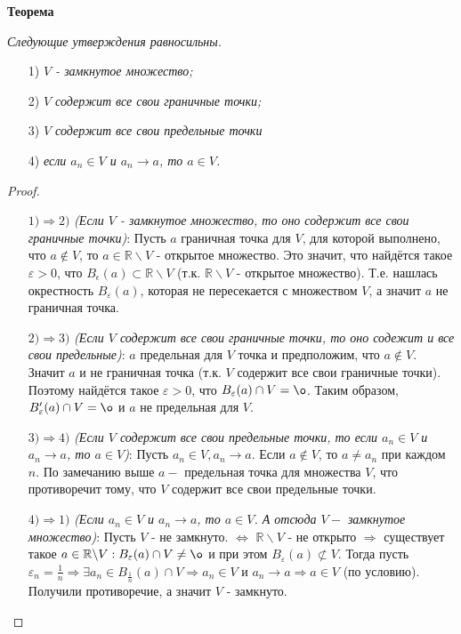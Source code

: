 \documentclass[12pt]{article}
\theoremstyle{definition}
\begin{document}
\textbf{Теорема}

\textit{Следующие утверждения равносильны.}

\begin{itemize}
    \item[1)] \textit{$V$ - замкнутое множество;}
    \item[2)] \textit{$V$ содержит все свои граничные точки;}
    \item[3)] \textit{$V$ содержит все свои предельные точки}
    \item[4)] \textit{если $a_n\in V$ и $a_n\rightarrow a$, то $a\in V$.}
\end{itemize}

\begin{proof}
 
\begin{itemize}
    \item[$1) \Rightarrow2)$]\textit{(Если $V$ - замкнутое множество, то оно содержит все свои граничные точки)}: \newline Пусть $a$ граничная точка для $V$, для которой выполнено, что $a\not\in V$, то $a\in\mathbb{R}\backslash V$ - открытое множество. Это значит, что найдётся такое $\varepsilon > 0$, что $B_\epsilon(a)\subset \mathbb{R}\backslash V$ (т.к. $\mathbb{R}\backslash V$ - открытое множество). Т.е. нашлась окрестность $B_\varepsilon(a)$, которая не пересекается с множеством $V$, а значит $a$ не граничная точка.
    \item[$2) \Rightarrow3)$] \textit{(Если $V$ содержит все свои граничные точки, то оно содежит и все свои предельные)}:  $a$ предельная для $V$ точка и предположим, что $a \not\in V$. Значит $a$ и не граничная точка (т.к. $V$ содержит все свои граничные точки). Поэтому найдётся такое $\varepsilon > 0$, что $B_\varepsilon(a)\cap V = \o$. Таким образом, $B'_\varepsilon(a)\cap V=\o$ и $a$ не предельная для $V$.
    \item[$3) \Rightarrow4)$] \textit{(Если $V$ содержит все свои предельные точки, то если $a_n\in V$ и $a_n\rightarrow a$, то $a\in V$)}: \newline Пусть $a_n\in V, a_n\rightarrow a$. Если $a\not\in V$, то $a\neq a_n$ при каждом $n$. По замечанию выше $a - $ предельная точка для множества $V$, что противоречит тому, что $V$ содержит все свои предельные точки.
    \item[$4) \Rightarrow1)$] \textit{(Если $a_n\in V$ и $a_n\rightarrow a$, то $a\in V$. А отсюда $V - $ замкнутое множество)}: \newline Пусть $V$ - не замкнуто. $\Leftrightarrow$ $\mathbb{R}\backslash V$ - не открыто $\Rightarrow$ существует такое $a\in \mathbb{R}\backslash V: B_\varepsilon(a) \cap V \neq \o$ и при этом $B_\varepsilon(a)\not\subset V$. Тогда пусть $\varepsilon_n = \frac{1}{n} \Rightarrow \exists a_n\in B_{\frac{1}{n}}(a) \cap V \Rightarrow a_n\in V$ и $a_n\rightarrow a \Rightarrow a\in V$ (по условию). Получили противоречие, а значит $V$ - замкнуто.
\end{itemize}
\end{proof}
\end{document}
